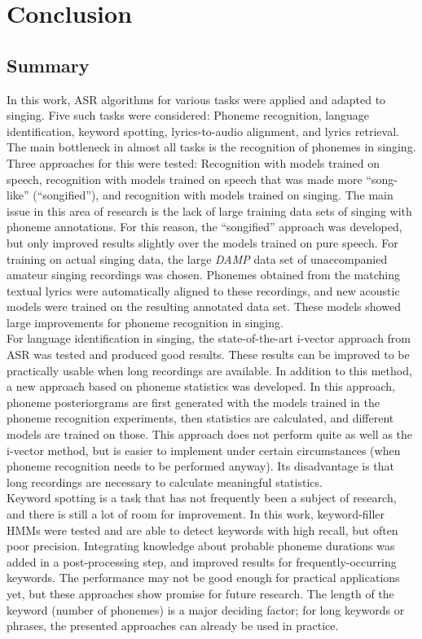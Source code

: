 \chapter{Conclusion} \label{chap:conclusion}
\section{Summary}
In this work, ASR algorithms for various tasks were applied and adapted to singing. Five such tasks were considered: Phoneme recognition, language identification, keyword spotting, lyrics-to-audio alignment, and lyrics retrieval.\\

The main bottleneck in almost all tasks is the recognition of phonemes in singing. Three approaches for this were tested: Recognition with models trained on speech, recognition with models trained on speech that was made more ``song-like'' (``songified''), and recognition with models trained on singing. The main issue in this area of research is the lack of large training data sets of singing with phoneme annotations. For this reason, the ``songified'' approach was developed, but only improved results slightly over the models trained on pure speech. For training on actual singing data, the large \textit{DAMP} data set of unaccompanied amateur singing recordings was chosen. Phonemes obtained from the matching textual lyrics were automatically aligned to these recordings, and new acoustic models were trained on the resulting annotated data set. These models showed large improvements for phoneme recognition in singing.\\

For language identification in singing, the state-of-the-art i-vector approach from ASR was tested and produced good results. These results can be improved to be practically usable when long recordings are available. In addition to this method, a new approach based on phoneme statistics was developed. In this approach, phoneme posteriorgrams are first generated with the models trained in the phoneme recognition experiments, then statistics are calculated, and different models are trained on those. This approach does not perform quite as well as the i-vector method, but is easier to implement under certain circumstances (when phoneme recognition needs to be performed anyway). Its disadvantage is that long recordings are necessary to calculate meaningful statistics.\\

Keyword spotting is a task that has not frequently been a subject of research, and there is still a lot of room for improvement. In this work, keyword-filler HMMs were tested and are able to detect keywords with high recall, but often poor precision. Integrating knowledge about probable phoneme durations was added in a post-processing step, and improved results for frequently-occurring keywords. The performance may not be good enough for practical applications yet, but these approaches show promise for future research. The length of the keyword (number of phonemes) is a major deciding factor; for long keywords or phrases, the presented approaches can already be used in practice.\\

